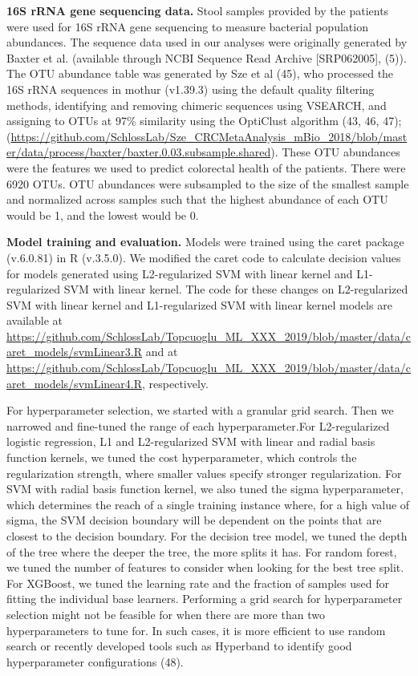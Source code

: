 \documentclass[11pt,]{article}
\begin{document}
\textbf{16S rRNA gene sequencing data.} Stool samples provided by the
patients were used for 16S rRNA gene sequencing to measure bacterial
population abundances. The sequence data used in our analyses were
originally generated by Baxter et al. (available through NCBI Sequence
Read Archive {[}SRP062005{]}, (5)). The OTU abundance table was
generated by Sze et al (45), who processed the 16S rRNA sequences in
mothur (v1.39.3) using the default quality filtering methods,
identifying and removing chimeric sequences using VSEARCH, and assigning
to OTUs at 97\% similarity using the OptiClust algorithm (43, 46, 47);
(\url{https://github.com/SchlossLab/Sze_CRCMetaAnalysis_mBio_2018/blob/master/data/process/baxter/baxter.0.03.subsample.shared}).
These OTU abundances were the features we used to predict colorectal
health of the patients. There were 6920 OTUs. OTU abundances were
subsampled to the size of the smallest sample and normalized across
samples such that the highest abundance of each OTU would be 1, and the
lowest would be 0.

\textbf{Model training and evaluation.} Models were trained using the
caret package (v.6.0.81) in R (v.3.5.0). We modified the caret code to
calculate decision values for models generated using L2-regularized SVM
with linear kernel and L1-regularized SVM with linear kernel. The code
for these changes on L2-regularized SVM with linear kernel and
L1-regularized SVM with linear kernel models are available at
\url{https://github.com/SchlossLab/Topcuoglu_ML_XXX_2019/blob/master/data/caret_models/svmLinear3.R}
and at
\url{https://github.com/SchlossLab/Topcuoglu_ML_XXX_2019/blob/master/data/caret_models/svmLinear4.R},
respectively.

For hyperparameter selection, we started with a granular grid search.
Then we narrowed and fine-tuned the range of each hyperparameter.For
L2-regularized logistic regression, L1 and L2-regularized SVM with
linear and radial basis function kernels, we tuned the cost
hyperparameter, which controls the regularization strength, where
smaller values specify stronger regularization. For SVM with radial
basis function kernel, we also tuned the sigma hyperparameter, which
determines the reach of a single training instance where, for a high
value of sigma, the SVM decision boundary will be dependent on the
points that are closest to the decision boundary. For the decision tree
model, we tuned the depth of the tree where the deeper the tree, the
more splits it has. For random forest, we tuned the number of features
to consider when looking for the best tree split. For XGBoost, we tuned
the learning rate and the fraction of samples used for fitting the
individual base learners. Performing a grid search for hyperparameter
selection might not be feasible for when there are more than two
hyperparameters to tune for. In such cases, it is more efficient to use
random search or recently developed tools such as Hyperband to identify
good hyperparameter configurations (48).
\end{document}
